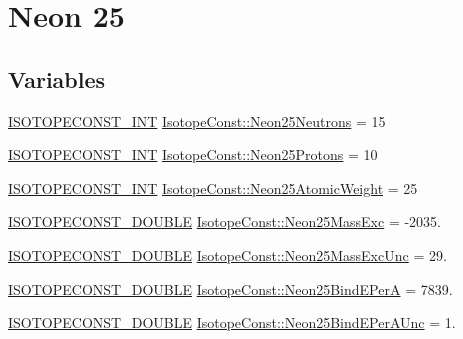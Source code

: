 \hypertarget{group___isotope_const-_neon-_ne25}{}\section{Neon 25}
\label{group___isotope_const-_neon-_ne25}
\subsection*{Variables}
\begin{DoxyCompactItemize}
\item 
\mbox{\hyperlink{group___isotope_const-_macros_ga5f18360b3e99483a35c32d789e62621c}{I\+S\+O\+T\+O\+P\+E\+C\+O\+N\+S\+T\+\_\+\+I\+NT}} \mbox{\hyperlink{group___isotope_const-_neon-_ne25_ga1617b2108dc86d32c794608e00a5dd8b}{Isotope\+Const\+::\+Neon25\+Neutrons}} = 15
\item 
\mbox{\hyperlink{group___isotope_const-_macros_ga5f18360b3e99483a35c32d789e62621c}{I\+S\+O\+T\+O\+P\+E\+C\+O\+N\+S\+T\+\_\+\+I\+NT}} \mbox{\hyperlink{group___isotope_const-_neon-_ne25_gaf26492a4e882a8a30698c02563d1efb4}{Isotope\+Const\+::\+Neon25\+Protons}} = 10
\item 
\mbox{\hyperlink{group___isotope_const-_macros_ga5f18360b3e99483a35c32d789e62621c}{I\+S\+O\+T\+O\+P\+E\+C\+O\+N\+S\+T\+\_\+\+I\+NT}} \mbox{\hyperlink{group___isotope_const-_neon-_ne25_ga0c55caf86996002ffac99badfb792acf}{Isotope\+Const\+::\+Neon25\+Atomic\+Weight}} = 25
\item 
\mbox{\hyperlink{group___isotope_const-_macros_ga8f45a7272ce02c0b4c65c44636ed719a}{I\+S\+O\+T\+O\+P\+E\+C\+O\+N\+S\+T\+\_\+\+D\+O\+U\+B\+LE}} \mbox{\hyperlink{group___isotope_const-_neon-_ne25_gac6c32eeb314f6146995f8eb0619a9eba}{Isotope\+Const\+::\+Neon25\+Mass\+Exc}} = -\/2035.
\item 
\mbox{\hyperlink{group___isotope_const-_macros_ga8f45a7272ce02c0b4c65c44636ed719a}{I\+S\+O\+T\+O\+P\+E\+C\+O\+N\+S\+T\+\_\+\+D\+O\+U\+B\+LE}} \mbox{\hyperlink{group___isotope_const-_neon-_ne25_ga5d9ca92b9b9e4e41240693bf93190023}{Isotope\+Const\+::\+Neon25\+Mass\+Exc\+Unc}} = 29.
\item 
\mbox{\hyperlink{group___isotope_const-_macros_ga8f45a7272ce02c0b4c65c44636ed719a}{I\+S\+O\+T\+O\+P\+E\+C\+O\+N\+S\+T\+\_\+\+D\+O\+U\+B\+LE}} \mbox{\hyperlink{group___isotope_const-_neon-_ne25_ga23fc0c742ac21db54e941a062c2e7e8c}{Isotope\+Const\+::\+Neon25\+Bind\+E\+PerA}} = 7839.
\item 
\mbox{\hyperlink{group___isotope_const-_macros_ga8f45a7272ce02c0b4c65c44636ed719a}{I\+S\+O\+T\+O\+P\+E\+C\+O\+N\+S\+T\+\_\+\+D\+O\+U\+B\+LE}} \mbox{\hyperlink{group___isotope_const-_neon-_ne25_gac3558be36740d7a39b6701d653bcca85}{Isotope\+Const\+::\+Neon25\+Bind\+E\+Per\+A\+Unc}} = 1.

\end{DoxyCompactItemize}
